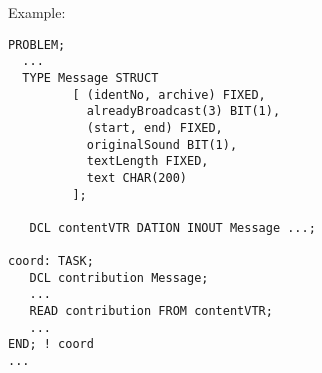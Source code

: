 Example:
\begin{lstlisting}
PROBLEM;
  ...
  TYPE Message STRUCT
         [ (identNo, archive) FIXED,
           alreadyBroadcast(3) BIT(1),
           (start, end) FIXED,
           originalSound BIT(1),
           textLength FIXED,
           text CHAR(200)
         ];
          
   DCL contentVTR DATION INOUT Message ...;
          
coord: TASK;
   DCL contribution Message;
   ...
   READ contribution FROM contentVTR;
   ...
END; ! coord
...     
\end{lstlisting}
